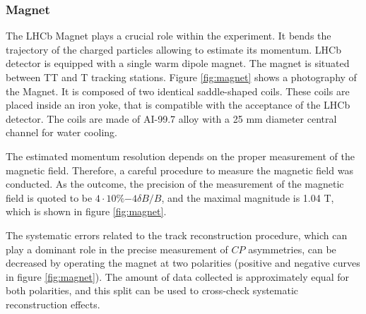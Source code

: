 \subsubsection{Magnet}

The LHCb Magnet plays a crucial role within the experiment. It bends the trajectory of the charged particles allowing to estimate its momentum. LHCb detector is equipped with a single warm dipole magnet. The magnet is situated between TT and T tracking stations. 
Figure \ref{fig:magnet} shows a photography of the Magnet. It is composed of two identical saddle-shaped coils. These coils are placed inside an iron yoke, that is compatible with the acceptance of the LHCb detector. The coils are made of AI-99.7 alloy with a 25 mm diameter central channel for water cooling. 

The estimated momentum resolution depends on the proper measurement of the magnetic field. Therefore, a careful procedure to measure the magnetic field was conducted. As the outcome, the precision of the measurement of the magnetic field is quoted to be $4 \cdot 10 \%{-4} \delta B /B $, and the maximal magnitude is 1.04 T, which is shown in figure \ref{fig:magnet}. 

The systematic errors related to the track reconstruction procedure, which can play a dominant role in the precise measurement of $CP$ asymmetries,  can be decreased by operating the magnet at two polarities (positive and negative curves in figure \ref{fig:magnet}). The amount of data collected is approximately equal for both polarities, and this split can be used to cross-check systematic reconstruction effects.

